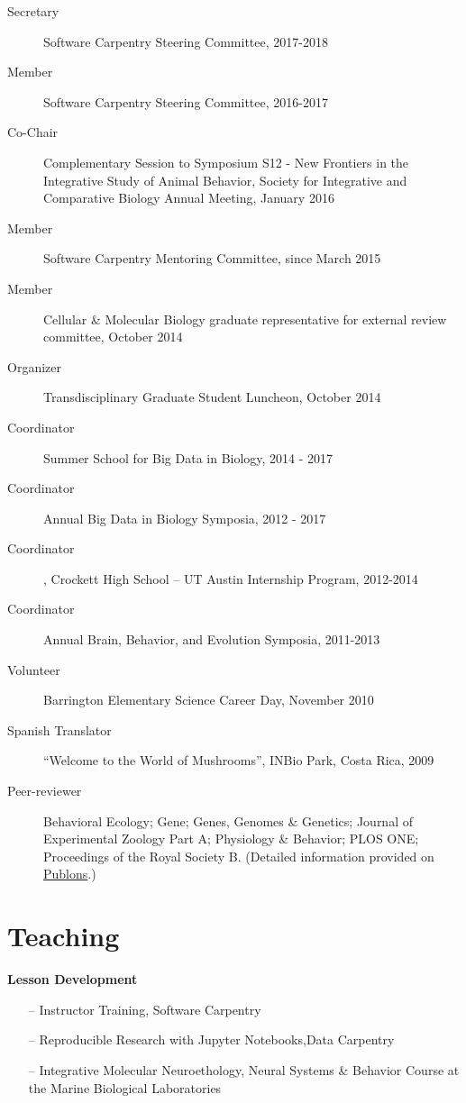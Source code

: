 \documentclass[margin,line]{resume}
\begin{document}
\begin{resume}
\begin{description}
\item[Secretary] Software Carpentry Steering Committee, 2017-2018
\item[Member] Software Carpentry Steering Committee, 2016-2017
\item[Co-Chair] Complementary Session to Symposium S12 - New Frontiers in the Integrative Study of Animal Behavior, Society for Integrative and Comparative Biology Annual Meeting, January 2016
\item[Member] Software Carpentry Mentoring Committee, since March 2015
\item[Member] Cellular \& Molecular Biology graduate representative for external review committee, October 2014 
\item[Organizer] Transdisciplinary Graduate Student Luncheon, October 2014
\item[Coordinator] Summer School for Big Data in Biology, 2014 - 2017
\item[Coordinator] Annual Big Data in Biology Symposia, 2012 - 2017 
\item[Coordinator] , Crockett High School – UT Austin Internship Program, 2012-2014
\item[Coordinator] Annual Brain, Behavior, and Evolution Symposia, 2011-2013
\item[Volunteer] Barrington Elementary Science Career Day, November 2010
\item[Spanish Translator] “Welcome to the World of Mushrooms”, INBio Park, Costa Rica, 2009
\item[Peer-reviewer] Behavioral Ecology; Gene; Genes, Genomes \& Genetics; Journal of Experimental Zoology Part A; Physiology \& Behavior; PLOS ONE; Proceedings of the Royal Society B. (Detailed information provided on \href{https://publons.com/author/444397/rayna-harris#profile)}{Publons}.) 
\end{description}

    
\section{\mysidestyle Teaching}

{\bf Lesson Development}
\begin{itemize}
\raggedright
\item[--] Instructor Training, Software Carpentry
\item[--] Reproducible Research with Jupyter Notebooks,Data Carpentry
\item[--] Integrative Molecular Neuroethology,  Neural Systems \& Behavior Course at the Marine Biological Laboratories


\end{itemize}
\end{resume}
\end{document}

